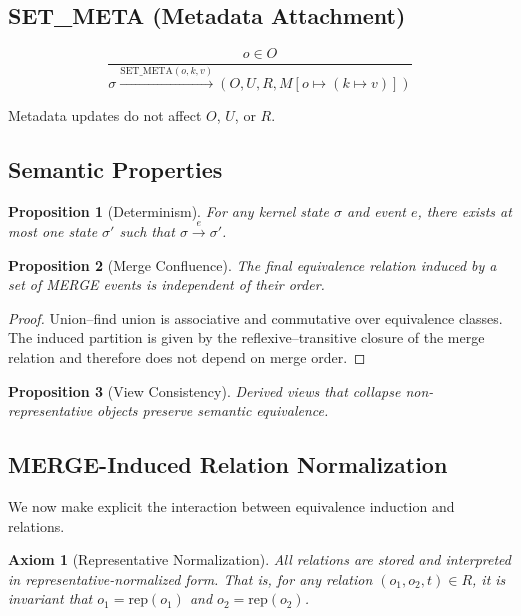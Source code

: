 \documentclass[11pt]{article}
\newtheorem{axiom}{Axiom}[section]
\newtheorem{proposition}{Proposition}[section]
\begin{document}
\subsection{SET\_META (Metadata Attachment)}

\[
\dfrac{ o \in O }{ \sigma \xrightarrow{\mathrm{SET\_META}(o,k,v)} (O, U, R, M[o \mapsto (k \mapsto v)]) }
\]

Metadata updates do not affect $O$, $U$, or $R$.

\subsection{Semantic Properties}

\begin{proposition}[Determinism]
For any kernel state $\sigma$ and event $e$, there exists at most one state $\sigma'$ such that $\sigma \xrightarrow{e} \sigma'$.
\end{proposition}

\begin{proposition}[Merge Confluence]
\label{prop:merge-confluence}
The final equivalence relation induced by a set of MERGE events is independent of their order.
\end{proposition}

\begin{proof}
Union--find union is associative and commutative over equivalence classes. The induced partition is given by the reflexive--transitive closure of the merge relation and therefore does not depend on merge order.
\end{proof}

\begin{proposition}[View Consistency]
Derived views that collapse non-representative objects preserve semantic equivalence.
\end{proposition}

\subsection{MERGE-Induced Relation Normalization}

We now make explicit the interaction between equivalence induction and relations.

\begin{axiom}[Representative Normalization]
All relations are stored and interpreted in representative-normalized form. That is, for any relation $(o_1,o_2,t) \in R$, it is invariant that $o_1 = \mathrm{rep}(o_1)$ and $o_2 = \mathrm{rep}(o_2)$.
\end{axiom}
\end{document}
